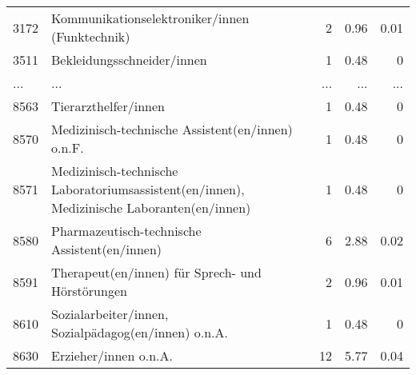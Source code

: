 \begin{longtable}{lXrrr}
        3172 & \multicolumn{1}{X}{Kommunikationselektroniker/innen (Funktechnik)} & %
          \num{2} &
          \num[round-mode=places,round-precision=2]{0,96} &
          \num[round-mode=places,round-precision=2]{0,01} \\
        3511 & \multicolumn{1}{X}{Bekleidungsschneider/innen} & %
          \num{1} &
          \num[round-mode=places,round-precision=2]{0,48} &
          \num[round-mode=places,round-precision=2]{0} \\
       ... & ... & ... & ... & ... \\
        8563 & \multicolumn{1}{X}{Tierarzthelfer/innen} & %
          \num{1} &
          \num[round-mode=places,round-precision=2]{0,48} &
          \num[round-mode=places,round-precision=2]{0} \\

        8570 & \multicolumn{1}{X}{Medizinisch-technische Assistent(en/innen) o.n.F.} & %
          \num{1} &
          \num[round-mode=places,round-precision=2]{0,48} &
          \num[round-mode=places,round-precision=2]{0} \\

        8571 & \multicolumn{1}{X}{Medizinisch-technische Laboratoriumsassistent(en/innen), Medizinische Laboranten(en/innen)} & %
          \num{1} &
          \num[round-mode=places,round-precision=2]{0,48} &
          \num[round-mode=places,round-precision=2]{0} \\

        8580 & \multicolumn{1}{X}{Pharmazeutisch-technische Assistent(en/innen)} & %
          \num{6} &
          \num[round-mode=places,round-precision=2]{2,88} &
          \num[round-mode=places,round-precision=2]{0,02} \\

        8591 & \multicolumn{1}{X}{Therapeut(en/innen) für Sprech- und Hörstörungen} & %
          \num{2} &
          \num[round-mode=places,round-precision=2]{0,96} &
          \num[round-mode=places,round-precision=2]{0,01} \\

        8610 & \multicolumn{1}{X}{Sozialarbeiter/innen, Sozialpädagog(en/innen) o.n.A.} & %
          \num{1} &
          \num[round-mode=places,round-precision=2]{0,48} &
          \num[round-mode=places,round-precision=2]{0} \\

        8630 & \multicolumn{1}{X}{Erzieher/innen o.n.A.} & %
          \num{12} &
          \num[round-mode=places,round-precision=2]{5,77} &
          \num[round-mode=places,round-precision=2]{0,04} \\


\end{longtable}
